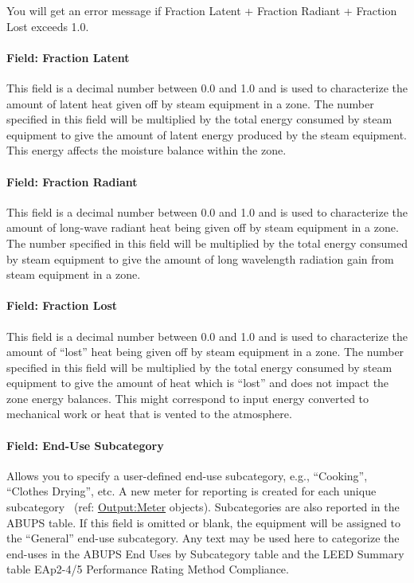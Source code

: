 You will get an error message if Fraction Latent + Fraction Radiant + Fraction Lost exceeds 1.0.

\paragraph{Field: Fraction Latent}\label{field-fraction-latent-3}

This field is a decimal number between 0.0 and 1.0 and is used to characterize the amount of latent heat given off by steam equipment in a zone. The number specified in this field will be multiplied by the total energy consumed by steam equipment to give the amount of latent energy produced by the steam equipment. This energy affects the moisture balance within the zone.

\paragraph{Field: Fraction Radiant}\label{field-fraction-radiant-5}

This field is a decimal number between 0.0 and 1.0 and is used to characterize the amount of long-wave radiant heat being given off by steam equipment in a zone. The number specified in this field will be multiplied by the total energy consumed by steam equipment to give the amount of long wavelength radiation gain from steam equipment in a zone.

\paragraph{Field: Fraction Lost}\label{field-fraction-lost-3}

This field is a decimal number between 0.0 and 1.0 and is used to characterize the amount of ``lost'' heat being given off by steam equipment in a zone. The number specified in this field will be multiplied by the total energy consumed by steam equipment to give the amount of heat which is ``lost'' and does not impact the zone energy balances. This might correspond to input energy converted to mechanical work or heat that is vented to the atmosphere.

\paragraph{Field: End-Use Subcategory}\label{field-end-use-subcategory-4-000}

Allows you to specify a user-defined end-use subcategory, e.g., ``Cooking'', ``Clothes Drying'', etc. A new meter for reporting is created for each unique subcategory~ (ref: \hyperref[outputmeter-and-outputmetermeterfileonly]{Output:Meter} objects). Subcategories are also reported in the ABUPS table. If this field is omitted or blank, the equipment will be assigned to the ``General'' end-use subcategory. Any text may be used here to categorize the end-uses in the ABUPS End Uses by Subcategory table and the LEED Summary table EAp2-4/5 Performance Rating Method Compliance.

